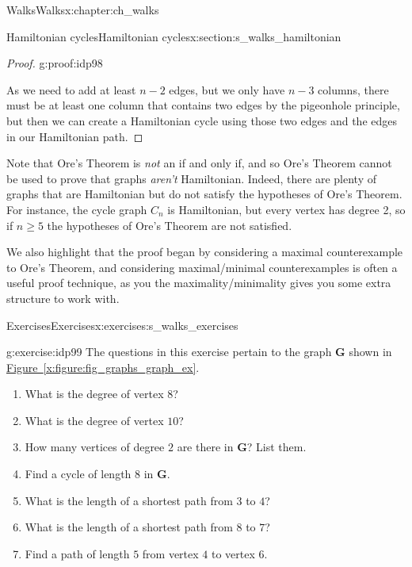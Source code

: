 \documentclass[oneside,10pt,]{book}
\newcommand{\xreffont}{\relax}
\numberwithin{equation}{section}
\newcommand{\bfG}{\mathbf{G}}
\begin{document}
\begin{chapterptx}{Walks}{}{Walks}{}{}{x:chapter:ch_walks}
\begin{sectionptx}{Hamiltonian cycles}{}{Hamiltonian cycles}{}{}{x:section:s_walks_hamiltonian}
\begin{proof}{}{g:proof:idp98}
\par
As we need to add at least \(n-2\) edges, but we only have \(n-3\) columns, there must be at least one column that contains two edges by the pigeonhole principle, but then we can create a Hamiltonian cycle using those two edges and the edges in our Hamiltonian path.%
\end{proof}
Note that Ore's Theorem is \emph{not} an if and only if, and so Ore's Theorem cannot be used to prove that graphs \emph{aren't} Hamiltonian.  Indeed, there are plenty of graphs that are Hamiltonian but do not satisfy the hypotheses of Ore's Theorem.  For instance, the cycle graph \(C_n\) is Hamiltonian, but every vertex has degree 2, so if \(n\geq 5\) the hypotheses of Ore's Theorem are not satisfied.%
\par
We also highlight that the proof began by considering a maximal counterexample to Ore's Theorem, and considering maximal\slash{}minimal counterexamples is often a useful proof technique, as you the maximality\slash{}minimality gives you some extra structure to work with.%
\end{sectionptx}
%
%
\typeout{************************************************}
\typeout{************************************************}
%
\begin{exercises-section}{Exercises}{}{Exercises}{}{}{x:exercises:s_walks_exercises}
\begin{divisionexercise}{1}{}{}{g:exercise:idp99}%
The questions in this exercise pertain to the graph \(\bfG\) shown in \hyperref[x:figure:fig_graphs_graph_ex]{Figure~{\xreffont\ref{x:figure:fig_graphs_graph_ex}}}.%
\begin{sidebyside}{2}{0.0125}{0.0125}{0.025}%
\begin{sbspanel}{0.6}%
%
\begin{enumerate}[label=(\alph*)]
\item{}What is the degree of vertex \(8\)?%
\item{}What is the degree of vertex \(10\)?%
\item{}How many vertices of degree \(2\) are there in \(\bfG\)? List them.%
\item{}Find a cycle of length \(8\) in \(\bfG\).%
\item{}What is the length of a shortest path from \(3\) to \(4\)?%
\item{}What is the length of a shortest path from \(8\) to \(7\)?%
\item{}Find a path of length \(5\) from vertex \(4\) to vertex \(6\).%

\end{enumerate}
\end{sbspanel}
\end{sidebyside}
\end{divisionexercise}
\end{exercises-section}
\end{chapterptx}
\end{document}
